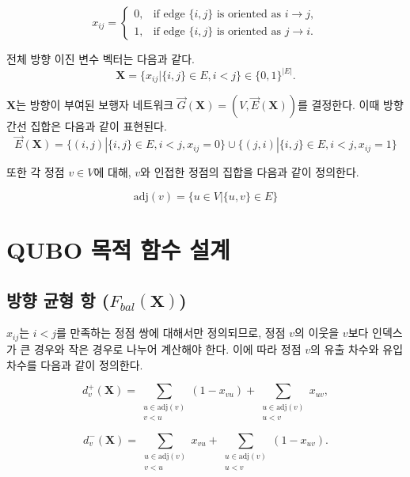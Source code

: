 \documentclass[11pt,a4paper]{article}
\begin{document}
\begin{equation}
x_{ij} =
    \begin{cases}
    0, & \text{if edge } \{i, j\} \text{ is oriented as } i \to j,\\
    1, & \text{if edge } \{i, j\} \text{ is oriented as } j \to i.
    \end{cases}
\end{equation}

전체 방향 이진 변수 벡터는 다음과 같다.
\begin{equation}
\mathbf{X} = \{x_{ij}  |  \{i, j\} \in E,  i < j\}  \in  \{0, 1\}^{|E|}.
\end{equation}

$\mathbf{X}$는 방향이 부여된 보행자 네트워크
$\vec{G}(\mathbf{X}) = (V, \vec{E}(\mathbf{X}))$를 결정한다.
이때 방향 간선 집합은 다음과 같이 표현된다.
\begin{equation}
\vec{E}(\mathbf{X}) =
\{(i, j)  | \{i, j\} \in E,  i < j,  x_{ij} = 0\}
\cup \{(j, i)  |  \{i, j\} \in E,  i < j,  x_{ij} = 1\}
\end{equation}

또한 각 정점 $v \in V$에 대해, $v$와 인접한 정점의 집합을 다음과 같이
정의한다.

\begin{equation}
\mathrm{adj}(v) = \{u \in V  |  \{u, v\} \in E\}
\end{equation}

\section{QUBO 목적 함수 설계}

\subsection{방향 균형 항 ($F_{bal}(\mathbf{X})$)}
$x_{ij}$는 $i < j$를 만족하는 정점 쌍에 대해서만 정의되므로,
정점 $v$의 이웃을 $v$보다 인덱스가 큰 경우와 작은 경우로 나누어
계산해야 한다.
이에 따라 정점 $v$의 유출 차수와 유입 차수를 다음과 같이 정의한다.

\begin{equation}
d_v^+ (\mathbf{X}) =
\sum_{\substack{u \in \mathrm{adj}(v)\\v<u}} (1 - x_{vu})
+
\sum_{\substack{u \in \mathrm{adj}(v)\\u<v}} x_{uv},
\end{equation}

\begin{equation}
d_v^- (\mathbf{X}) =
\sum_{\substack{u \in \mathrm{adj}(v)\\v<u}} x_{vu}
+
\sum_{\substack{u \in \mathrm{adj}(v)\\u<v}} (1 - x_{uv}).
\end{equation}
\end{document}
